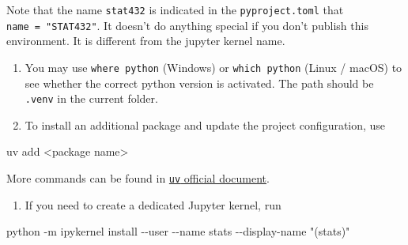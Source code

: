 \documentclass[
  letterpaper,
  DIV=11,
  numbers=noendperiod]{scrreprt}
\newenvironment{Shaded}{\begin{snugshade}}{\end{snugshade}}
\newcommand{\AttributeTok}[1]{\textcolor[rgb]{0.40,0.45,0.13}{#1}}
\newcommand{\CommentTok}[1]{\textcolor[rgb]{0.37,0.37,0.37}{#1}}
\newcommand{\ExtensionTok}[1]{\textcolor[rgb]{0.00,0.23,0.31}{#1}}
\newcommand{\KeywordTok}[1]{\textcolor[rgb]{0.00,0.23,0.31}{\textbf{#1}}}
\newcommand{\NormalTok}[1]{\textcolor[rgb]{0.00,0.23,0.31}{#1}}
\newcommand{\OperatorTok}[1]{\textcolor[rgb]{0.37,0.37,0.37}{#1}}
\newcommand{\StringTok}[1]{\textcolor[rgb]{0.13,0.47,0.30}{#1}}
\providecommand{\tightlist}{%
  \setlength{\itemsep}{0pt}\setlength{\parskip}{0pt}}
\theoremstyle{definition}
\theoremstyle{definition}
\theoremstyle{plain}
\theoremstyle{plain}
\theoremstyle{remark}
\begin{document}
\begin{tcolorbox}
\begin{Shaded}
\end{Shaded}

Note that the name \texttt{stat432} is indicated in the
\texttt{pyproject.toml} that \texttt{name\ =\ "STAT432"}. It doesn't do
anything special if you don't publish this environment. It is different
from the jupyter kernel name.

\begin{enumerate}
\def\labelenumi{\arabic{enumi}.}
\setcounter{enumi}{2}
\tightlist
\item
  You may use \texttt{where\ python} (Windows) or \texttt{which\ python}
  (Linux / macOS) to see whether the correct python version is
  activated. The path should be \texttt{.venv} in the current folder.
\item
  To install an additional package and update the project configuration,
  use
\end{enumerate}

\begin{Shaded}
\begin{Highlighting}[]
\ExtensionTok{uv}\NormalTok{ add }\OperatorTok{\textless{}}\NormalTok{package name}\OperatorTok{\textgreater{}}
\end{Highlighting}
\end{Shaded}

More commands can be found in
\href{https://docs.astral.sh/uv/getting-started/}{\texttt{uv} official
document}.

\begin{enumerate}
\def\labelenumi{\arabic{enumi}.}
\setcounter{enumi}{4}
\tightlist
\item
  If you need to create a dedicated Jupyter kernel, run
\end{enumerate}

\begin{Shaded}
\begin{Highlighting}[]
\ExtensionTok{python} \AttributeTok{{-}m}\NormalTok{ ipykernel install }\AttributeTok{{-}{-}user} \AttributeTok{{-}{-}name}\NormalTok{ stats }\AttributeTok{{-}{-}display{-}name} \StringTok{"(stats)"}
\end{Highlighting}
\end{Shaded}


\end{tcolorbox}
\end{document}
